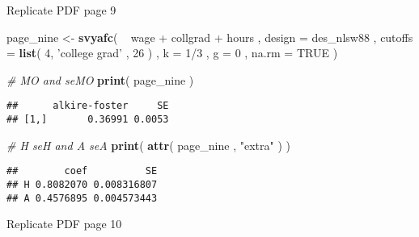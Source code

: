 \documentclass[]{book}
\newenvironment{Shaded}{\begin{snugshade}}{\end{snugshade}}
\newcommand{\KeywordTok}[1]{\textcolor[rgb]{0.13,0.29,0.53}{\textbf{{#1}}}}
\newcommand{\DataTypeTok}[1]{\textcolor[rgb]{0.13,0.29,0.53}{{#1}}}
\newcommand{\DecValTok}[1]{\textcolor[rgb]{0.00,0.00,0.81}{{#1}}}
\newcommand{\StringTok}[1]{\textcolor[rgb]{0.31,0.60,0.02}{{#1}}}
\newcommand{\CommentTok}[1]{\textcolor[rgb]{0.56,0.35,0.01}{\textit{{#1}}}}
\newcommand{\OtherTok}[1]{\textcolor[rgb]{0.56,0.35,0.01}{{#1}}}
\newcommand{\NormalTok}[1]{{#1}}
\begin{document}
Replicate PDF page 9

\begin{Shaded}
\begin{Highlighting}[]
\NormalTok{page_nine <-}
\StringTok{  }\KeywordTok{svyafc}\NormalTok{(}
    \NormalTok{~}\StringTok{ }\NormalTok{wage +}\StringTok{ }\NormalTok{collgrad +}\StringTok{ }\NormalTok{hours , }
    \DataTypeTok{design =} \NormalTok{des_nlsw88 , }
    \DataTypeTok{cutoffs =} \KeywordTok{list}\NormalTok{( }\DecValTok{4}\NormalTok{, }\StringTok{'college grad'} \NormalTok{, }\DecValTok{26} \NormalTok{) , }
    \DataTypeTok{k =} \DecValTok{1}\NormalTok{/}\DecValTok{3} \NormalTok{, }\DataTypeTok{g =} \DecValTok{0} \NormalTok{, }
    \DataTypeTok{na.rm =} \OtherTok{TRUE}
  \NormalTok{)}

\CommentTok{# MO and seMO}
\KeywordTok{print}\NormalTok{( page_nine )}
\end{Highlighting}
\end{Shaded}

\begin{verbatim}
##      alkire-foster     SE
## [1,]       0.36991 0.0053
\end{verbatim}

\begin{Shaded}
\begin{Highlighting}[]
\CommentTok{# H seH and A seA}
\KeywordTok{print}\NormalTok{( }\KeywordTok{attr}\NormalTok{( page_nine , }\StringTok{"extra"} \NormalTok{) )}
\end{Highlighting}
\end{Shaded}

\begin{verbatim}
##        coef          SE
## H 0.8082070 0.008316807
## A 0.4576895 0.004573443
\end{verbatim}

Replicate PDF page 10
\end{document}
